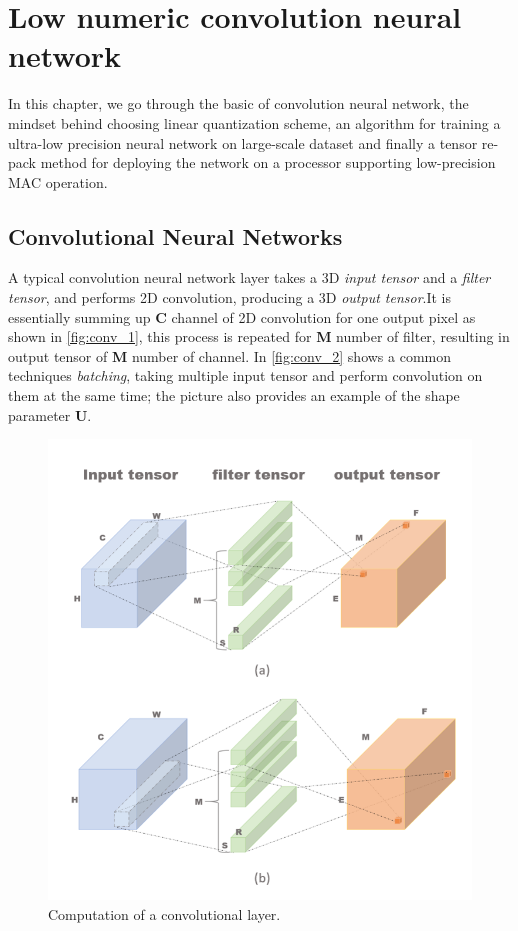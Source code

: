 \chapter{Low numeric convolution neural network}
\label{ch:low prec NN}


In this chapter, we go through the basic of convolution neural network, the mindset behind choosing linear quantization scheme, an algorithm for training a ultra-low precision neural network on large-scale dataset and finally a tensor re-pack method for deploying the network on a processor supporting low-precision MAC operation.
\section{Convolutional Neural Networks}
A typical convolution neural network layer takes a 3D \textit{input tensor} and a \textit{filter tensor}, and performs 2D convolution, producing a 3D \textit{output tensor}.It is essentially summing up \textbf{C} channel of 2D convolution for one output pixel as shown in \autoref{fig:conv_1}, this process is repeated for \textbf{M} number of filter, resulting in output tensor of \textbf{M} number of channel. 
In \autoref{fig:conv_2} shows a common techniques \textit{batching}, taking multiple input tensor and perform convolution on them at the same time; the picture also provides an example of the shape parameter \textbf{U}.
\begin{figure}
    \centering
    \includegraphics[width=1\linewidth]{inc/3_low_numeric_convolution_neural_network/figure/convolution_1.png}
    \caption{Computation of a convolutional layer.}
    \label{fig:conv_1}
\end{figure}
